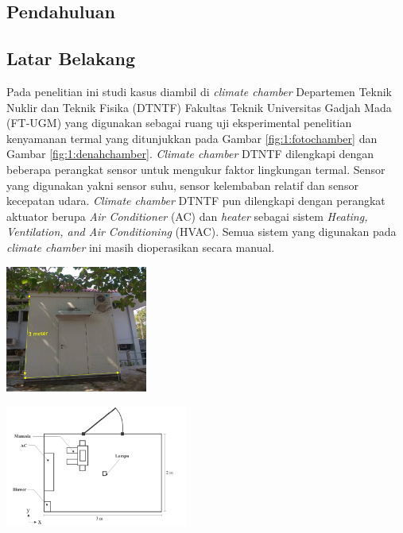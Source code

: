 \documentclass[a4paper,10pt]{article}
\makeatletter
\newenvironment{body}{\begin{multicols}{2}}{\end{multicols}}
\renewenvironment{figure}
{\def\@captype{figure}%
	\captionsetup{labelsep=period,format=hang,font=footnotesize,justification=justified}
}
{}
\makeatother
\begin{document}
	\begin{body}
		\section{Pendahuluan}
		
		\subsection{Latar Belakang}\label{latar belakang}
		
		Pada penelitian ini studi kasus diambil di \textit{climate chamber} Departemen Teknik Nuklir dan Teknik Fisika (DTNTF) Fakultas Teknik Universitas Gadjah Mada (FT-UGM) yang digunakan sebagai ruang uji eksperimental penelitian kenyamanan termal yang ditunjukkan pada Gambar \ref{fig:1:fotochamber} dan Gambar \ref{fig:1:denahchamber}. \textit{Climate chamber} DTNTF dilengkapi dengan beberapa perangkat sensor untuk mengukur faktor lingkungan termal. Sensor yang digunakan yakni sensor suhu, sensor kelembaban relatif dan sensor kecepatan udara. \textit{Climate chamber} DTNTF pun dilengkapi dengan perangkat aktuator berupa \textit{Air Conditioner} (AC) dan \textit{heater} sebagai sistem \textit{Heating, Ventilation, and Air Conditioning} (HVAC). Semua sistem yang digunakan pada \textit{climate chamber} ini masih dioperasikan secara manual.\\
		
		\begin{figure}
			\centering
			\includegraphics[width=0.35\textwidth]{figures/climatechamber}
			\caption{Foto \textit{Climate chamber} DTNTF FT-UGM}
			\label{fig:1:fotochamber}
		\end{figure}
	
		\vspace{1mm}
		
		\begin{figure}
			\centering
			\centering
			\includegraphics[width=0.45\textwidth]{figures/DenahChamber}
			\caption{Denah \textit{Climate Chamber} DTNTF FT-UGM\cite{skripsiIchfan}}
			\label{fig:1:denahchamber}
		\end{figure}
	

\end{body}
\end{document}
